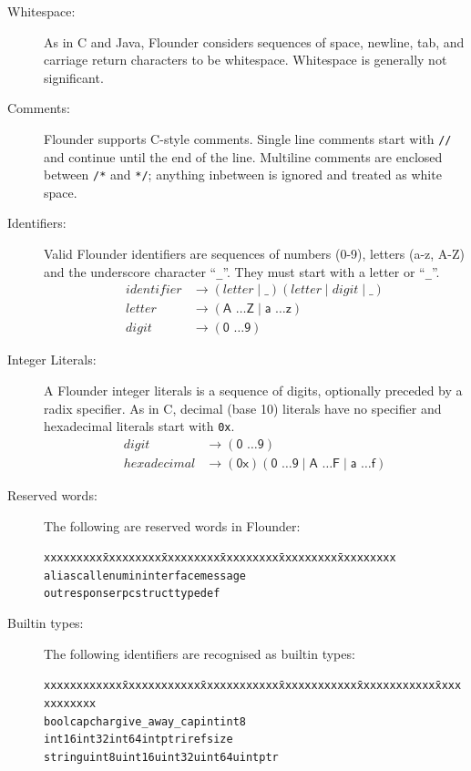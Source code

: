 \documentclass[a4paper,twoside]{report} %
\begin{document}
\begin{description}
\item[Whitespace:]  As in C and Java, Flounder considers sequences of
  space, newline, tab, and carriage return characters to be
  whitespace.  Whitespace is generally not significant. 

\item[Comments:] Flounder supports C-style comments.  Single line comments
  start with \texttt{//} and continue until the end of the line.
  Multiline comments are enclosed between \texttt{/*} and \texttt{*/};
  anything inbetween is ignored and treated as white space.

\item[Identifiers:] Valid Flounder identifiers are sequences of numbers
  (0-9), letters (a-z, A-Z) and the underscore character ``\texttt{\_}''.  They
  must start with a letter or ``\texttt{\_}''.
  \begin{align*}
    identifier & \rightarrow ( letter \mid \_ ) (letter \mid digit \mid \_) \\
    letter & \rightarrow (\textsf{A \ldots Z} \mid  \textsf{a \ldots z})\\
    digit & \rightarrow (\textsf{0 \ldots 9})
\end{align*}
  
\item[Integer Literals:] A Flounder integer literals is a sequence of
  digits, optionally preceded by a radix specifier.  As in C, decimal (base 10)
  literals have no specifier and hexadecimal literals start with
  \texttt{0x}.
\begin{align*}
digit & \rightarrow (\textsf{0 \ldots 9})\\
hexadecimal & \rightarrow (\textsf{0x})(\textsf{0 \ldots 9} \mid \textsf{A
\ldots F} \mid \textsf{a \ldots f})
\end{align*}


\item[Reserved words:] The following are reserved words in Flounder:
\begin{alltt}\begin{tabbing}
xxxxxxxxx \= xxxxxxxxx \= xxxxxxxxx \= xxxxxxxxx \= xxxxxxxxx \= xxxxxxxxx \kill
alias \> call \> enum \> in \> interface \> message \\
out \> response \> rpc \> struct \> typedef 
\end{tabbing}\end{alltt}

\item[Builtin types:] The following identifiers are recognised as builtin types:
\begin{alltt}\begin{tabbing}
xxxxxxxxxxxx \= xxxxxxxxxxxx \= xxxxxxxxxxxx \= xxxxxxxxxxxx \= xxxxxxxxxxxx \=
xxxxxxxxxxxx \kill
bool \> cap \> char \> give_away_cap \> int \> int8 \\
int16 \> int32 \> int64 \> intptr \> iref \> size \\
string \> uint8 \> uint16 \> uint32 \> uint64 \> uintptr
\end{tabbing}\end{alltt}


\end{description}
\end{document}
